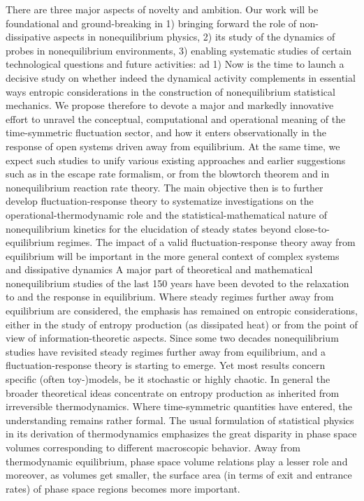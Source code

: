 There are three major aspects of novelty and ambition.  Our work will be foundational and ground-breaking in 1) bringing forward the role of non-dissipative aspects in nonequilibrium physics, 2) its study of the dynamics of probes in nonequilibrium environments, 3) enabling systematic studies of certain technological questions and future activities:
ad 1) Now is the time to launch a decisive study on whether indeed the dynamical activity complements in essential ways entropic considerations in the construction of nonequilibrium statistical  mechanics. We propose therefore to devote a major and markedly innovative effort to unravel the conceptual, computational and operational meaning of the time-symmetric fluctuation sector, and how it enters observationally in the response of open systems driven away from equilibrium. At the same time, we expect such studies to unify various existing approaches and earlier suggestions such as in the escape rate formalism, or from the blowtorch theorem and in nonequilibrium reaction rate theory. The main objective then is to further develop fluctuation-response theory to systematize investigations on the operational-thermodynamic role and the statistical-mathematical nature of nonequilibrium kinetics for the elucidation of steady states beyond close-to-equilibrium regimes. The impact of a valid fluctuation-response theory away from equilibrium will be important in the more general context of complex systems and dissipative dynamics
A major part of theoretical and mathematical nonequilibrium studies of the last 150 years have been devoted to the relaxation to and the response in equilibrium. Where steady regimes further away from equilibrium are considered, the emphasis has remained on entropic considerations, either in the study of entropy production (as dissipated heat) or from the point of view of information-theoretic aspects.
Since some two decades nonequilibrium studies have revisited steady regimes further away from equilibrium, and a fluctuation-response theory is starting to emerge. Yet most results concern specific (often toy-)models, be it stochastic or highly chaotic. In general the broader theoretical ideas concentrate on entropy production as inherited from irreversible thermodynamics. Where time-symmetric quantities have entered, the understanding remains rather formal.
The usual formulation of statistical physics in its derivation of thermodynamics emphasizes the great disparity in phase space volumes corresponding to different macroscopic behavior. Away from thermodynamic equilibrium, phase space volume relations play a lesser role and moreover, as volumes get smaller, the surface area (in terms of exit and entrance rates) of phase space regions becomes more important.
